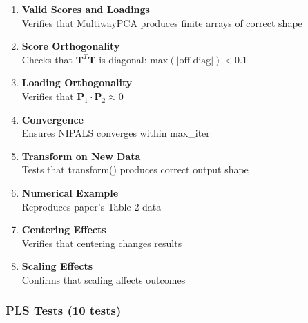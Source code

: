 \documentclass[12pt,a4paper]{article}
\begin{document}
\begin{enumerate}
    \item \textbf{Valid Scores and Loadings} \\
    Verifies that MultiwayPCA produces finite arrays of correct shape

    \item \textbf{Score Orthogonality} \\
    Checks that $\mathbf{T}^T \mathbf{T}$ is diagonal: $\text{max}(|\text{off-diag}|) < 0.1$

    \item \textbf{Loading Orthogonality} \\
    Verifies that $\mathbf{P}_1 \cdot \mathbf{P}_2 \approx 0$

    \item \textbf{Convergence} \\
    Ensures NIPALS converges within max\_iter

    \item \textbf{Transform on New Data} \\
    Tests that transform() produces correct output shape

    \item \textbf{Numerical Example} \\
    Reproduces paper's Table 2 data

    \item \textbf{Centering Effects} \\
    Verifies that centering changes results

    \item \textbf{Scaling Effects} \\
    Confirms that scaling affects outcomes
\end{enumerate}

\subsubsection{PLS Tests (10 tests)}
\end{document}
